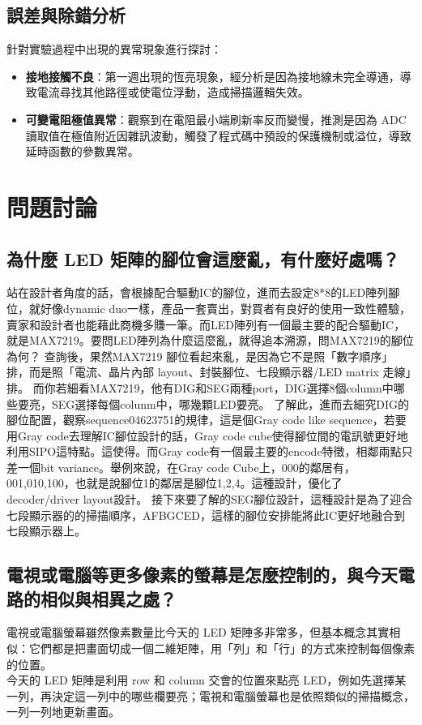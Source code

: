 \documentclass[12pt]{article}
\begin{document}
\subsection{誤差與除錯分析}
針對實驗過程中出現的異常現象進行探討：
\begin{itemize}
    \item \textbf{接地接觸不良}：第一週出現的恆亮現象，經分析是因為接地線未完全導通，導致電流尋找其他路徑或使電位浮動，造成掃描邏輯失效。
    \item \textbf{可變電阻極值異常}：觀察到在電阻最小端刷新率反而變慢，推測是因為 ADC 讀取值在極值附近因雜訊波動，觸發了程式碼中預設的保護機制或溢位，導致延時函數的參數異常。
\end{itemize}


\section{問題討論}


\subsection{為什麼 LED 矩陣的腳位會這麼亂，有什麼好處嗎？}
站在設計者角度的話，會根據配合驅動IC的腳位，進而去設定8*8的LED陣列腳位，就好像dynamic duo一樣，產品一套賣出，對買者有良好的使用一致性體驗，賣家和設計者也能藉此商機多賺一筆。而LED陣列有一個最主要的配合驅動IC，就是MAX7219。要問LED陣列為什麼這麼亂，就得追本溯源，問MAX7219的腳位為何？
查詢後，果然MAX7219 腳位看起來亂，是因為它不是照「數字順序」排，而是照「電流、晶片內部 layout、封裝腳位、七段顯示器/LED matrix 走線」排。
而你若細看MAX7219，他有DIG和SEG兩種port，DIG選擇8個column中哪些要亮，SEG選擇每個colunm中，哪幾顆LED要亮。
了解此，進而去細究DIG的腳位配置，觀察sequence{04623751}的規律，這是個Gray code like sequence，若要用Gray code去理解IC腳位設計的話，Gray code cube使得腳位間的電訊號更好地利用SIPO這特點。這使得。而Gray code有一個最主要的encode特徵，相鄰兩點只差一個bit variance。舉例來說，在Gray code Cube上，{000}的鄰居有，{001},{010},{100}，也就是說腳位1的鄰居是腳位1,2,4。這種設計，優化了decoder/driver layout設計。
接下來要了解的SEG腳位設計，這種設計是為了迎合七段顯示器的的掃描順序，AFBGCED，這樣的腳位安排能將此IC更好地融合到七段顯示器上。


\subsection{電視或電腦等更多像素的螢幕是怎麼控制的，與今天電路的相似與相異之處？}

電視或電腦螢幕雖然像素數量比今天的 LED 矩陣多非常多，但基本概念其實相似：它們都是把畫面切成一個二維矩陣，用「列」和「行」的方式來控制每個像素的位置。\\
今天的 LED 矩陣是利用 row 和 column 交會的位置來點亮 LED，例如先選擇某一列，再決定這一列中的哪些欄要亮；電視和電腦螢幕也是依照類似的掃描概念，一列一列地更新畫面。\\
\end{document}
